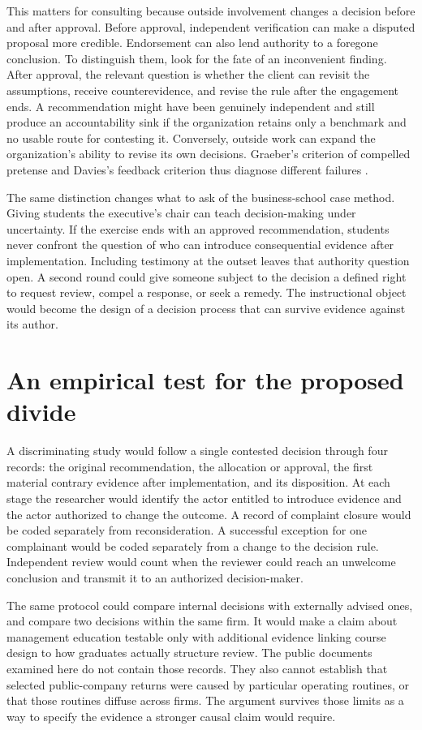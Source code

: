 \documentclass[11pt]{article}
\begin{document}
This matters for consulting because outside involvement changes a decision before and after approval. Before approval, independent verification can make a disputed proposal more credible. Endorsement can also lend authority to a foregone conclusion. To distinguish them, look for the fate of an inconvenient finding. After approval, the relevant question is whether the client can revisit the assumptions, receive counterevidence, and revise the rule after the engagement ends. A recommendation might have been genuinely independent and still produce an accountability sink if the organization retains only a benchmark and no usable route for contesting it. Conversely, outside work can expand the organization's ability to revise its own decisions. Graeber's criterion of compelled pretense and Davies's feedback criterion thus diagnose different failures \citep{graeber2018bullshit,daviesTaming,denning2026businessschools}.

The same distinction changes what to ask of the business-school case method. Giving students the executive's chair can teach decision-making under uncertainty. If the exercise ends with an approved recommendation, students never confront the question of who can introduce consequential evidence after implementation. Including testimony at the outset leaves that authority question open. A second round could give someone subject to the decision a defined right to request review, compel a response, or seek a remedy. The instructional object would become the design of a decision process that can survive evidence against its author.

\section{An empirical test for the proposed divide}
A discriminating study would follow a single contested decision through four records: the original recommendation, the allocation or approval, the first material contrary evidence after implementation, and its disposition. At each stage the researcher would identify the actor entitled to introduce evidence and the actor authorized to change the outcome. A record of complaint closure would be coded separately from reconsideration. A successful exception for one complainant would be coded separately from a change to the decision rule. Independent review would count when the reviewer could reach an unwelcome conclusion and transmit it to an authorized decision-maker.

The same protocol could compare internal decisions with externally advised ones, and compare two decisions within the same firm. It would make a claim about management education testable only with additional evidence linking course design to how graduates actually structure review. The public documents examined here do not contain those records. They also cannot establish that selected public-company returns were caused by particular operating routines, or that those routines diffuse across firms. The argument survives those limits as a way to specify the evidence a stronger causal claim would require.
\end{document}

